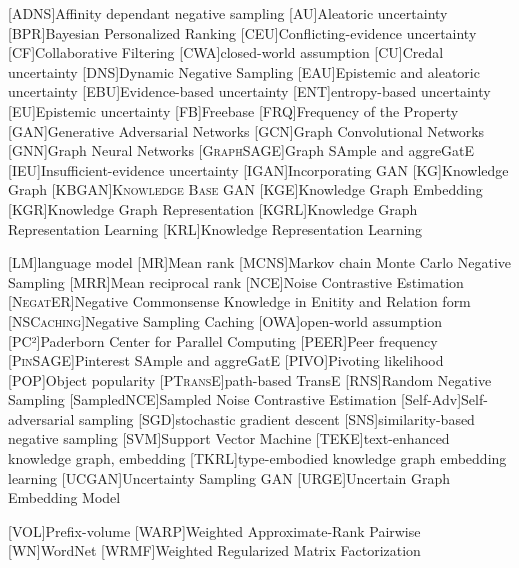 \begin{acronym}[ECU]
[\textsc{ADNS}]{Affinity dependant negative sampling}
[AU]{Aleatoric uncertainty}
[BPR]{Bayesian Personalized Ranking}
[CEU]{Conflicting-evidence uncertainty}
[CF]{Collaborative Filtering}
[CWA]{closed-world assumption}
[CU]{Credal uncertainty}
[DNS]{Dynamic Negative Sampling}
[EAU]{Epistemic and aleatoric uncertainty}
[EBU]{Evidence-based uncertainty}
[ENT]{entropy-based uncertainty}
[EU]{Epistemic uncertainty}
[\textsc{FB}]{Freebase}
[\textsc{FRQ}]{Frequency of the Property}
[GAN]{Generative Adversarial Networks}
[GCN]{Graph Convolutional Networks}
[GNN]{Graph Neural Networks}
[\textsc{GraphSAGE}]{Graph SAmple and aggreGatE}
[IEU]{Insufficient-evidence uncertainty}
[\textsc{IGAN}]{Incorporating GAN}
[KG]{Knowledge Graph}
[\textsc{KBGAN}]{\textsc{Knowledge Base GAN}}
[KGE]{Knowledge Graph Embedding}
[KGR]{Knowledge Graph Representation}
[KGRL]{Knowledge Graph Representation Learning}
[KRL]{Knowledge Representation Learning}

[LM]{language model}
[MR]{Mean rank}
[\textsc{MCNS}]{Markov chain Monte Carlo Negative Sampling}
[MRR]{Mean reciprocal rank}
[NCE]{Noise Contrastive Estimation}
[\textsc{NegatER}]{Negative Commonsense Knowledge in Enitity and Relation form}
[\textsc{NSCaching}]{Negative Sampling Caching}
[OWA]{open-world assumption}
[PC²]{Paderborn Center for Parallel Computing}
[\textsc{PEER}]{Peer frequency}
[\textsc{PinSAGE}]{Pinterest SAmple and aggreGatE}
[\textsc{PIVO}]{Pivoting likelihood}
[\textsc{POP}]{Object popularity}
[\textsc{PTransE}]{path-based TransE}
[RNS]{Random Negative Sampling}
[SampledNCE]{Sampled Noise Contrastive Estimation}
[Self-Adv]{Self-adversarial sampling}
[SGD]{stochastic gradient descent}
[SNS]{similarity-based negative sampling}
[SVM]{Support Vector Machine}
[\textsc{TEKE}]{text-enhanced knowledge graph, embedding}
[\textsc{TKRL}]{type-embodied knowledge graph embedding learning}
[\textsc{UCGAN}]{Uncertainty Sampling GAN}
[\textsc{URGE}]{Uncertain Graph Embedding Model}

[\textsc{VOL}]{Prefix-volume}
[WARP]{Weighted Approximate-Rank Pairwise}
[\textsc{WN}]{WordNet}
[WRMF]{Weighted Regularized Matrix Factorization}
\end{acronym}